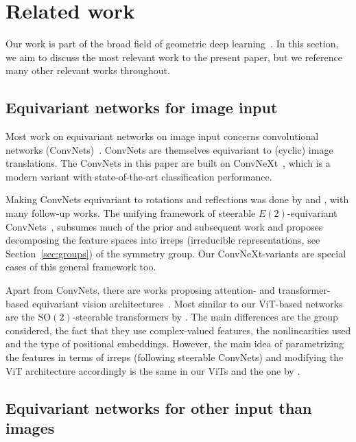 \section{Related work}
%
\label{sec:related_work}
Our work is part of the broad field of geometric deep learning~\cite{bronsteinGeometricDeepLearning2021}.
In this section, we aim to discuss the most relevant work to the present paper, but we reference many other relevant works throughout.

\subsection{Equivariant networks for image input}\label{sec:equi_image}
Most work on equivariant networks on image input concerns convolutional networks (ConvNets)~\cite{fukushima1975cognitron, lecun-1989}.
ConvNets are themselves equivariant to (cyclic) image translations.
The ConvNets in this paper are built on ConvNeXt~\cite{liu2022convnext}, which is a modern variant with state-of-the-art classification performance.

Making ConvNets equivariant to rotations and reflections was done by \citet{cohen2016group} and \citet{dieleman2016exploiting}, with many follow-up works.
The unifying framework of steerable $E(2)$-equivariant ConvNets~\cite{cohen-steerable, weiler_cesa_2019}, subsumes much of the prior and subsequent work and proposes decomposing the feature spaces into irreps (irreducible representations, see Section~\ref{sec:groups}) of the symmetry group.
Our ConvNeXt-variants are special cases of this general framework too.

Apart from ConvNets, there are works proposing attention- and transformer-based equivariant vision architectures~\cite{romero2020attentive, xu20232}.
Most similar to our ViT-based networks are the $\mathrm{SO}(2)$-steerable transformers by \citet{steerabletransformers:2024}.
The main differences are the group considered, the fact that they use complex-valued features, the nonlinearities used and the type of positional embeddings.
However, the main idea of parametrizing the features in terms of irreps (following steerable ConvNets) and modifying the ViT architecture accordingly is the same in our ViTs and the one by \citet{steerabletransformers:2024}.


\subsection{Equivariant networks for other input than images}


